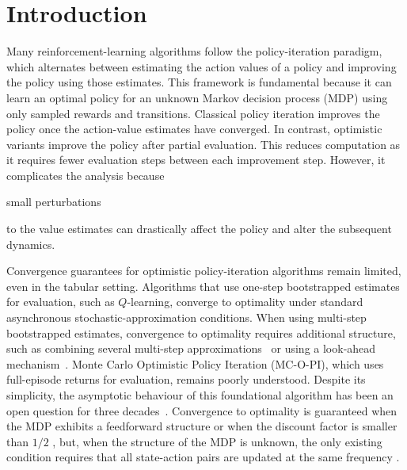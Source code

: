 
\section{Introduction}














Many reinforcement-learning algorithms follow the policy-iteration paradigm, which alternates between
estimating the action values of a policy
and improving the policy using those estimates.
This framework is fundamental because it can learn an optimal policy for an unknown Markov decision process (MDP) using only sampled rewards and transitions.
Classical policy iteration improves the policy once the action-value estimates have converged.
In contrast, optimistic variants improve the policy after partial evaluation.
This reduces computation as it requires fewer evaluation steps between each improvement step.
However, it complicates the analysis because

small perturbations

to the value estimates
can drastically affect the policy and alter the subsequent dynamics.


















Convergence guarantees for optimistic policy-iteration algorithms remain limited, even in the tabular setting.
Algorithms that use one-step bootstrapped estimates for evaluation, such as $Q$-learning, converge to optimality under standard asynchronous stochastic-approximation conditions.
When using multi-step bootstrapped estimates, convergence to optimality requires additional structure, such as combining several multi-step approximations~\citep{Harutyunyan2016QCorrections, Munos2016SafeLearning} or using a look-ahead mechanism~\citep{Winnicki2023OnEvaluation}.
Monte Carlo Optimistic Policy Iteration (MC-O-PI), which uses full-episode returns for evaluation, remains poorly understood. Despite its simplicity, the asymptotic behaviour of this foundational algorithm has been an open question for three decades~\citep{Sutton1999OpenLearning}.
Convergence to optimality is guaranteed when the MDP exhibits a feedforward structure \citep{Wang2022OnLearning, Lubars2021OptimisticStructure}
or when the discount factor is smaller than $1/2$ \citep{Delattre2025MarkovAlgorithm},
but, when the structure of the MDP is unknown, the only existing condition requires that all state-action pairs are updated at the same frequency \citep{Tsitsiklis2002OnIteration, Chen2018OnProblem, Liu2021OnStarts}.















